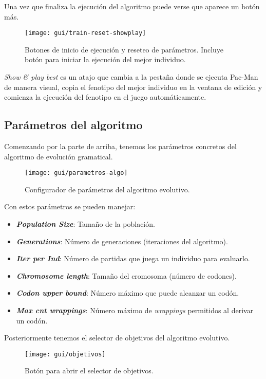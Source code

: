 Una vez que finaliza la ejecución del algoritmo puede verse que aparece un botón más.
\begin{figure}[H]
\centering
\texttt{[image: gui/train-reset-showplay]}
\caption{Botones de inicio de ejecución y reseteo de parámetros. Incluye botón para iniciar la ejecución del mejor individuo.}
\end{figure}

\textit{Show \& play best} es un atajo que cambia a la pestaña donde se ejecuta Pac-Man de manera visual, copia el fenotipo del mejor individuo en la ventana de edición y comienza la ejecución del fenotipo en el juego automáticamente.

\subsection{Parámetros del algoritmo}
Comenzando por la parte de arriba, tenemos los parámetros concretos del algoritmo de evolución gramatical.
\begin{figure}[H]
\centering
\texttt{[image: gui/parametros-algo]}
\caption{Configurador de parámetros del algoritmo evolutivo.}
\end{figure}

Con estos parámetros se pueden manejar:
\begin{itemize}
\item \textbf{\textit{Population Size}}: Tamaño de la población.

\item \textbf{\textit{Generations}}: Número de generaciones (iteraciones del algoritmo).

\item \textbf{\textit{Iter per Ind}}: Número de partidas que juega un individuo para evaluarlo.

\item \textbf{\textit{Chromosome length}}: Tamaño del cromosoma (número de codones).

\item \textbf{\textit{Codon upper bound}}: Número máximo que puede alcanzar un codón.

\item \textbf{\textit{Max cnt wrappings}}: Número máximo de \textit{wrappings} permitidos al derivar un codón.
\end{itemize}

Posteriormente tenemos el selector de objetivos del algoritmo evolutivo.
\begin{figure}[H]
\centering
\texttt{[image: gui/objetivos]}
\caption{Botón para abrir el selector de objetivos.}
\end{figure}

